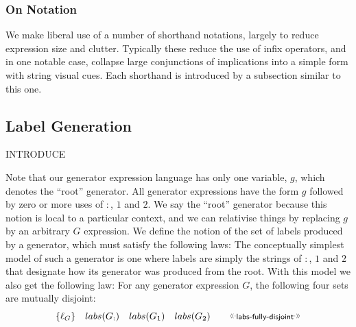 \subsubsection{On Notation}

We make liberal use of a number of shorthand notations,
largely to reduce expression size and clutter.
Typically these reduce the use of infix operators,
and in one notable case, collapse large conjunctions
of implications into a simple form with string visual cues.
Each shorthand is introduced by a subsection similar to this one.

\subsection{Label Generation}

INTRODUCE

Note that our generator expression language has only one variable, $g$,
which denotes the ``root'' generator.
All generator expressions have the form $g$ followed by zero
or more uses of $:$, $1$ and $2$.
We say the  ``root'' generator because this notion is local to a
particular context, and we can relativise things by replacing $g$
by an arbitrary $G$ expression.
We define the notion of the set of labels produced by a generator,
which must satisfy the following laws:
The conceptually simplest model of such a generator
is one where labels are simply the strings of $:$, $1$ and $2$
that designate how its generator was produced from the root.
With this model we also get the following law:
For any generator expression $G$,
the following four sets are mutually disjoint:
\[
  \setof{\ell_G}
  \quad
  labs(G_{:})
  \quad
  labs(G_1)
  \quad
  labs(G_2)
  \qquad
  \elabel{labs-fully-disjoint}
\]

